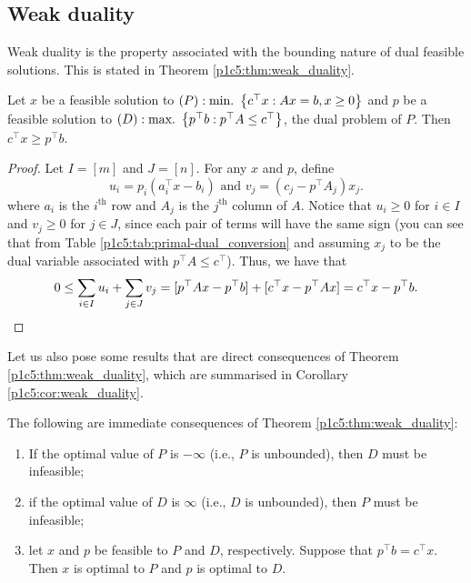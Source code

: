 \subsection{Weak duality}

Weak duality is the property associated with the bounding nature of dual feasible solutions. This is stated in Theorem \ref{p1c5:thm:weak_duality}.

\begin{theorem} \label{p1c5:thm:weak_duality}
		Let $x$ be a feasible solution to $(P) : \mathop{\text{min.~}}\left\{ c^\top x : Ax = b, x \geq 0 \right \}$ and $p$ be a feasible solution to $(D) : \mathop{\text{max.~}}\left\{ p^\top b : p^\top A \leq c^\top \right \}$, the dual problem of $P$. Then $c^\top x \geq p^\top b$.
\end{theorem}

\begin{proof}
	Let $I = [m]$ and $J = [n]$. For any $x$ and $p$, define
%
	  	\begin{equation*}
			u_i = p_i (a_i^\top x - b_i) \text{ and }
			v_j = (c_j - p^\top A_j)x_j.	
		\end{equation*}
%
	where $a_i$ is the $i^\text{th}$ row and $A_j$ is the $j^\text{th}$ column of $A$. Notice that $u_i \geq 0$ for $i \in I$ and $v_j \geq 0$ for $j \in J$, since each pair of terms will have the same sign (you can see that from Table \ref{p1c5:tab:primal-dual_conversion} and assuming $x_j$ to be the dual variable associated with $p^\top A \leq c^\top$).  Thus, we have that
%
	\begin{equation*}
		0 \leq \sum_{i \in I} u_i + \sum_{j \in J} v_j = [p^\top Ax - p^\top b] + [c^\top x - p^\top Ax] = c^\top x - p^\top b. \qedhere
	\end{equation*}
%
\end{proof}

Let us also pose some results that are direct consequences of Theorem \ref{p1c5:thm:weak_duality}, which are summarised in Corollary \ref{p1c5:cor:weak_duality}.

\begin{corollary}\label{p1c5:cor:weak_duality}
	The following are immediate consequences of Theorem \ref{p1c5:thm:weak_duality}:
	\begin{enumerate}
		\item[(1)] If the optimal value of $P$ is $-\infty$ (i.e., $P$ is unbounded), then $D$ must be infeasible;
		\item[(2)] if the optimal value of $D$ is $\infty$ (i.e., $D$ is unbounded), then $P$ must be infeasible;
		\item[(3)] let $x$ and $p$ be feasible to $P$ and $D$, respectively. Suppose that $p^\top b = c^\top x$. Then $x$ is optimal to $P$ and $p$ is optimal to $D$.
	\end{enumerate}
\end{corollary}

